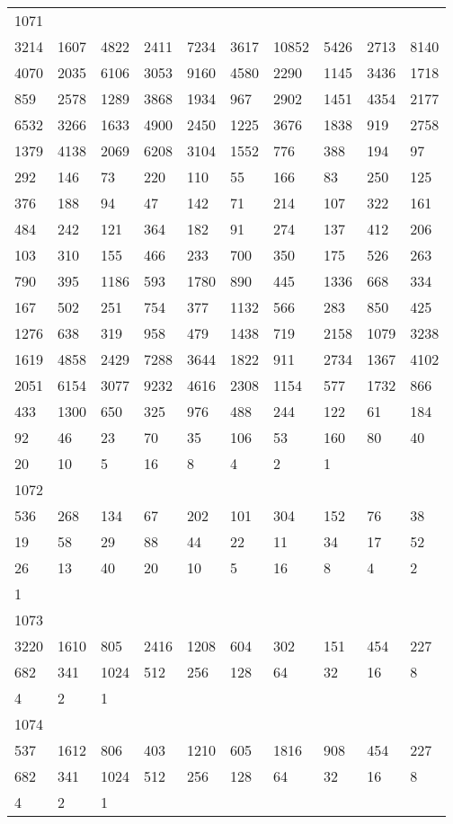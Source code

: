 \begin{longtable}{*{10}{l}}
1071&&&&&&&&&\\
3214& 1607& 4822& 2411& 7234& 3617& 10852& 5426& 2713& 8140\\
4070& 2035& 6106& 3053& 9160& 4580& 2290& 1145& 3436& 1718\\
859& 2578& 1289& 3868& 1934& 967& 2902& 1451& 4354& 2177\\
6532& 3266& 1633& 4900& 2450& 1225& 3676& 1838& 919& 2758\\
1379& 4138& 2069& 6208& 3104& 1552& 776& 388& 194& 97\\
292& 146& 73& 220& 110& 55& 166& 83& 250& 125\\
376& 188& 94& 47& 142& 71& 214& 107& 322& 161\\
484& 242& 121& 364& 182& 91& 274& 137& 412& 206\\
103& 310& 155& 466& 233& 700& 350& 175& 526& 263\\
790& 395& 1186& 593& 1780& 890& 445& 1336& 668& 334\\
167& 502& 251& 754& 377& 1132& 566& 283& 850& 425\\
1276& 638& 319& 958& 479& 1438& 719& 2158& 1079& 3238\\
1619& 4858& 2429& 7288& 3644& 1822& 911& 2734& 1367& 4102\\
2051& 6154& 3077& 9232& 4616& 2308& 1154& 577& 1732& 866\\
433& 1300& 650& 325& 976& 488& 244& 122& 61& 184\\
92& 46& 23& 70& 35& 106& 53& 160& 80& 40\\
20& 10& 5& 16& 8& 4& 2& 1& \\

1072&&&&&&&&&\\
536& 268& 134& 67& 202& 101& 304& 152& 76& 38\\
19& 58& 29& 88& 44& 22& 11& 34& 17& 52\\
26& 13& 40& 20& 10& 5& 16& 8& 4& 2\\
1& \\

1073&&&&&&&&&\\
3220& 1610& 805& 2416& 1208& 604& 302& 151& 454& 227\\
682& 341& 1024& 512& 256& 128& 64& 32& 16& 8\\
4& 2& 1& \\

1074&&&&&&&&&\\
537& 1612& 806& 403& 1210& 605& 1816& 908& 454& 227\\
682& 341& 1024& 512& 256& 128& 64& 32& 16& 8\\
4& 2& 1& \\


\end{longtable}

